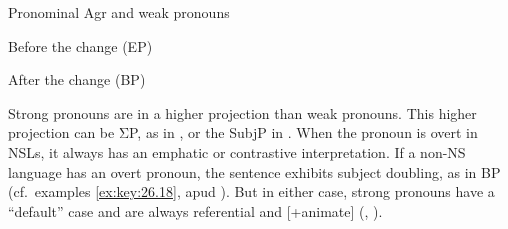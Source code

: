 \documentclass[output=paper]{langsci/langscibook}
\begin{document}
\begin{exe}
\ex Pronominal Agr and weak pronouns\label{ex:key:26.fig3}\\
\noindent\begin{minipage}[t]{.5\textwidth}
    \sn
    \begin{xlist}
     Before the change (\gls{EP})\\
    \end{xlist}
\end{minipage}
\noindent\begin{minipage}[t]{.5\textwidth}
    \sn
    \begin{xlist}
     After the change (\gls{BP})\\
    \end{xlist}
\end{minipage}
\end{exe}

Strong pronouns are in a higher projection than weak pronouns. This higher
projection can be ΣP, as in \citet{Martins1994}, or the SubjP in
\citet{Cardinaletti:2004a}. When the pronoun is overt in \gls{NSL}s, it always
has an emphatic or contrastive interpretation. If a non-NS language has an
overt pronoun, the sentence exhibits subject doubling, as in
\gls{BP} (cf.\ examples \eqref{ex:key:26.18}, apud
\citealt{Kato2012}). But in either case, strong pronouns have a “default” case
and are always referential and  [+animate] (\citealt{Kato1999},
\citealt{Schutze2001}).\newpage
\end{document}
